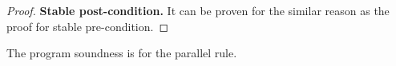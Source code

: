\begin{proof}
\textbf{Stable post-condition.} 
It can be proven for the similar reason as the proof for stable pre-condition.
\end{proof}

The program soundness is for the parallel rule.

